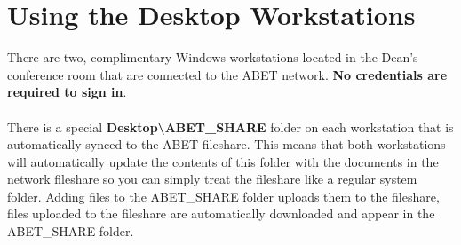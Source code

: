 \documentclass{article}
\begin{document}
\section{Using the Desktop Workstations}

There are two, complimentary Windows workstations located in the Dean's
conference room that are connected to the ABET network. \textbf{No credentials are
required to sign in}.
\\\\
There is a special \textbf{Desktop\textbackslash ABET\_SHARE} folder on each
workstation that is automatically synced to the ABET fileshare. This means
that both workstations will automatically update the contents of
this folder with the documents in the network fileshare so you can simply treat the
fileshare like a regular system folder. Adding files to the ABET\_SHARE
folder uploads them to the fileshare, files uploaded to the fileshare are
automatically downloaded and appear in the ABET\_SHARE folder.
\end{document}
